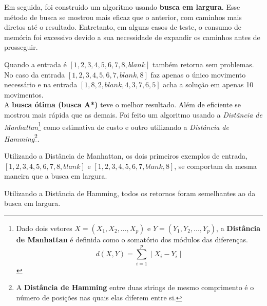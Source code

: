 \documentclass[12pt,a4paper]{article}
\begin{document}
Em seguida, foi construido um algoritmo usando \textbf{busca em largura}. Esse método de busca se mostrou mais eficaz que o anterior, com caminhos mais diretos até o resultado. Entretanto, em alguns casos de teste, o consumo de memória foi excessivo devido a sua necessidade de expandir os caminhos antes de prosseguir.

Quando a entrada é $[1,2,3,4,5,6,7,8,blank]$ também retorna sem problemas. No caso da entrada $[1,2,3,4,5,6,7,blank,8]$ faz apenas o único movimento necessário e na entrada $[1,8,2,blank,4,3,7,6,5]$ acha a solução em apenas 10 movimentos.
\\

A \textbf{busca ótima (busca A*)} teve o melhor resultado. Além de eficiente se mostrou mais rápida que as demais. Foi feito um algoritmo usando a \textit{Distância de Manhattan}\footnote{Dado dois vetores $X=(X_1,X_2,...,X_p)$ e $Y=(Y_1,Y_2,...,Y_p)$, a \textbf{Distância de Manhattan} é definida como o somatório dos módulos das diferenças. $$d(X,Y)= \sum_{i=1}^{p} \mid X_i - Y_i \mid$$} como estimativa de custo e outro utilizando a \textit{Distância de Hamming}\footnote{A \textbf{Distância de Hamming} entre duas strings de mesmo comprimento é o número de posições nas quais elas diferem entre si.}.

Utilizando a Distância de Manhattan, os dois primeiros exemplos de entrada,  $[1,2,3,4,5,6,7,8,blank]$ e $[1,2,3,4,5,6,7,blank,8]$, se comportam da mesma maneira que a busca em largura.

Utilizando a Distância de Hamming, todos os retornos foram semelhantes ao da busca em largura.
\end{document}
